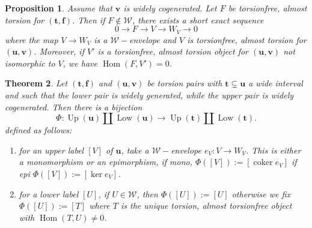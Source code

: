 \documentclass[10pt,a4paper]{amsart}
\newtheorem{theorem}{Theorem}[section]
\newtheorem{proposition}[theorem]{Proposition}
\newcommand{\coker}{\operatorname{coker}}
\newcommand{\Hom}{\operatorname{Hom}}
\newcommand{\Up}{\operatorname{Up}}
\newcommand{\Low}{\operatorname{Low}}
\newcommand{\tpair}[2]{(\mathbf{#1}, \mathbf{#2})  }
\begin{document}
\begin{proposition}
\label{prop:upper-exchange-dual}
Assume that \(\mathbf v\) is widely cogenerated. Let \(F\)  be torsionfree, almost torsion for \(\tpair{t}{f}\). Then if \( F \not \in \mathcal{W} \), there exists a short exact sequence
\[
0 \to F \to V \to W_V \to 0 
\]
where the map \( V \to W_V \) is a \( \mathcal{W}-\)envelope and \( V \) is torsionfree, almost torsion for \( \tpair{u}{v} \). Moreover, if \( V' \) is a torsionfree, almost torsion object for \( \tpair{u}{v} \) not isomorphic to \( V \), we have \( \Hom(F, V') = 0 \).
\end{proposition}


\begin{theorem}
\label{thm:full-mutation-labels}
Let \( \tpair{t}{f} \) and \( \tpair{u}{v} \) be torsion pairs with \( \mathbf{t} \subsetneq \mathbf{u} \) a wide interval and such that the lower pair is widely generated, while the upper pair is widely cogenerated.
Then there is a bijection
\[
\Phi : \Up(\mathbf u)\coprod \Low(\mathbf u) \to \Up(\mathbf t)\coprod \Low(\mathbf t).
\]
defined as follows:
\begin{enumerate}
\item for an upper label $ [V] $ of $ \mathbf{u} $, take a $ \mathcal{W}-$envelope $ e_V : V \to W_V $. This is either a monomorphism or an epimorphism, if mono, $ \Phi([V]) := [\coker e_V] $ if epi $ \Phi([V]) := [\ker e_V] $.
\item for a lower label $ [U] $, if $ U \in \mathcal{W} $, then $ \Phi([U]) := [U] $ otherwise we fix $ \Phi([U]) := [T] $ where $ T $ is the unique torsion, almost torsionfree object with \( \Hom(T, U) \ne 0 \).
\end{enumerate}
\end{theorem}
\end{document}
